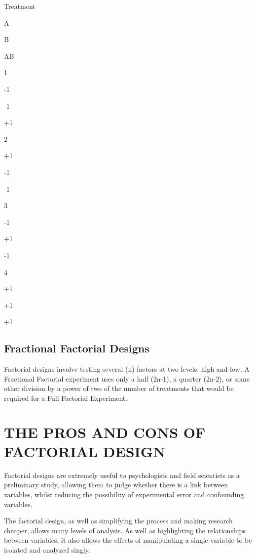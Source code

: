 \documentclass[]{article}
\begin{document}
Treatment
 

A
 

B
 

AB
 



1
 

-1
 

-1
 

+1
 



2
 

+1
 

-1
 

-1
 



3
 

-1
 

+1
 

-1
 



4
 

+1
 

+1
 

+1
 


\subsection{Fractional Factorial Designs}

 

Factorial designs involve testing several (n) factors at two levels, high and low. A Fractional Factorial experiment uses only a half (2n-1), a quarter (2n-2), or some other division by a power of two of the number of treatments that would be required for a Full Factorial Experiment.


\section{THE PROS AND CONS OF FACTORIAL DESIGN}

Factorial designs are extremely useful to psychologists and field scientists as a preliminary study, allowing them to judge whether there is a link between variables, whilst reducing the possibility of experimental error and confounding variables.

The factorial design, as well as simplifying the process and making research cheaper, allows many levels of analysis. As well as highlighting the relationships between variables, it also allows the effects of manipulating a single variable to be isolated and analyzed singly.
\end{document}
